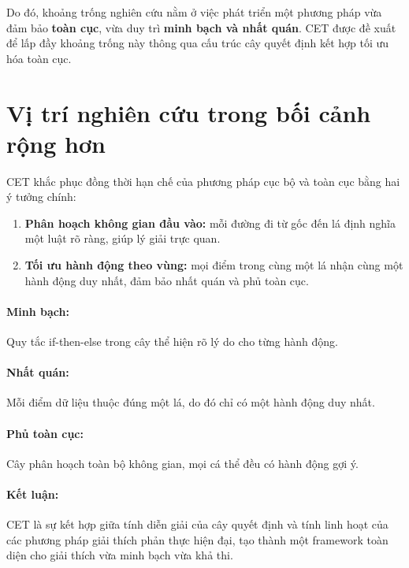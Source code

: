 Do đó, khoảng trống nghiên cứu nằm ở việc phát triển một phương pháp vừa đảm bảo \textbf{toàn cục}, vừa duy trì \textbf{minh bạch và nhất quán}. CET được đề xuất để lấp đầy khoảng trống này thông qua cấu trúc cây quyết định kết hợp tối ưu hóa toàn cục.

\section{Vị trí nghiên cứu trong bối cảnh rộng hơn}
CET khắc phục đồng thời hạn chế của phương pháp cục bộ và toàn cục bằng hai ý tưởng chính:
\begin{enumerate}
\item \textbf{Phân hoạch không gian đầu vào:} mỗi đường đi từ gốc đến lá định nghĩa một luật rõ ràng, giúp lý giải trực quan.
\item \textbf{Tối ưu hành động theo vùng:} mọi điểm trong cùng một lá nhận cùng một hành động duy nhất, đảm bảo nhất quán và phủ toàn cục.
\end{enumerate}


\paragraph{Minh bạch:} Quy tắc if-then-else trong cây thể hiện rõ lý do cho từng hành động.
\paragraph{Nhất quán:} Mỗi điểm dữ liệu thuộc đúng một lá, do đó chỉ có một hành động duy nhất.
\paragraph{Phủ toàn cục:} Cây phân hoạch toàn bộ không gian, mọi cá thể đều có hành động gợi ý.

\paragraph{Kết luận:} CET là sự kết hợp giữa tính diễn giải của cây quyết định và tính linh hoạt của các phương pháp giải thích phản thực hiện đại, tạo thành một framework toàn diện cho giải thích vừa minh bạch vừa khả thi.


